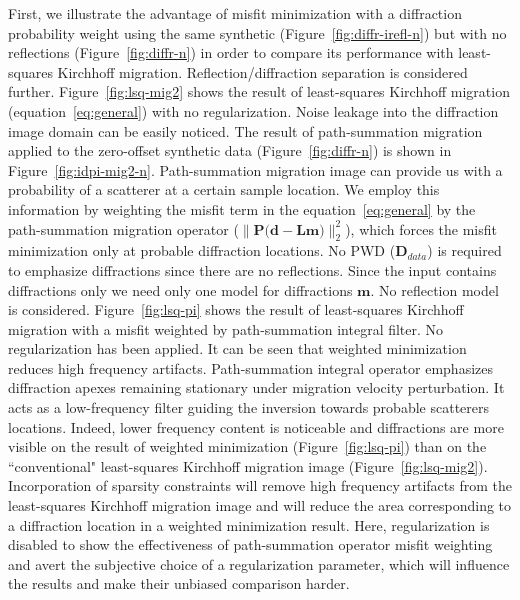 
First, we illustrate the advantage of misfit minimization with a diffraction probability weight using
the same synthetic (Figure~\ref{fig:diffr-irefl-n}) but with no reflections (Figure~\ref{fig:diffr-n})
in order to compare its performance with least-squares Kirchhoff migration. Reflection/diffraction separation is
considered further. Figure~\ref{fig:lsq-mig2} shows the result of least-squares Kirchhoff migration (equation~\ref{eq:general}) with no regularization. Noise leakage into
the diffraction image domain can be easily noticed. The result of path-summation migration applied to the zero-offset synthetic data (Figure~\ref{fig:diffr-n})
is shown in Figure~\ref{fig:idpi-mig2-n}. Path-summation migration image can provide us
with a probability of a scatterer at a certain sample location. We employ this information by weighting the misfit term in the
equation~\ref{eq:general} by the path-summation migration operator ($\| \mathbf{P} \big( \mathbf{d} - \mathbf{Lm} \big) \|_{2}^{2}$), which forces the misfit minimization only at probable diffraction
locations. No PWD ($\mathbf{D}_{data}$) is required to emphasize diffractions since there are no reflections.
Since the input contains diffractions only we need only one model for diffractions $\mathbf{m}$. No reflection model is considered.
Figure~\ref{fig:lsq-pi} shows the result of least-squares Kirchhoff migration with a misfit
weighted by path-summation integral filter. No regularization has been applied. It can be seen 
that weighted minimization reduces high frequency artifacts. Path-summation integral operator emphasizes 
diffraction apexes remaining stationary under migration velocity perturbation. It acts as a low-frequency 
filter guiding the inversion towards probable scatterers locations. Indeed, lower frequency content is noticeable
and diffractions are more visible on the result of weighted minimization (Figure~\ref{fig:lsq-pi}) than on the ``conventional" least-squares Kirchhoff migration image
(Figure~\ref{fig:lsq-mig2}). Incorporation of sparsity constraints will remove high
frequency artifacts from the least-squares Kirchhoff migration image and will reduce the area
corresponding to a diffraction location in a weighted minimization result. Here, regularization is disabled to show the effectiveness
of path-summation operator misfit weighting and avert the subjective choice of a regularization parameter, which will influence the results
and make their unbiased comparison harder.   

